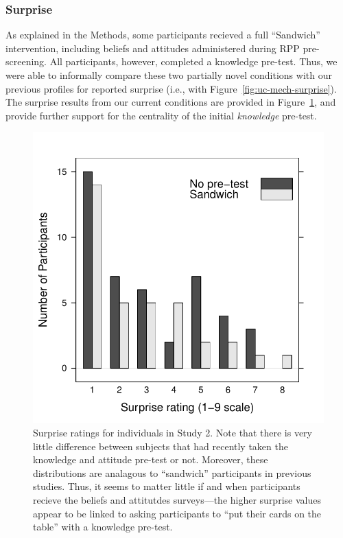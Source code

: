\subsubsection{Surprise}

As explained in the Methods, some participants recieved a full “Sandwich”
intervention, including beliefs and attitudes administered during RPP
pre-screening. All participants, however, completed a knowledge pre-test. Thus,
we were able to informally compare these two partially novel conditions with our
previous profiles for reported surprise (i.e., with
Figure~\ref{fig:uc-mech-surprise}). The surprise results from our current
conditions are provided in Figure~\ref{fig:rpp-mech-surprise}, and provide
further support for the centrality of the initial \emph{knowledge} pre-test.

\begin{figure}
    \centering
    \includegraphics{RPP-mech-surprise-by-group.pdf}
    \caption{Surprise ratings for individuals in Study 2. Note that there is
        very little difference between subjects that had recently taken the
        knowledge and attitude pre-test or not. Moreover, these distributions
        are analagous to “sandwich” participants in previous studies. Thus, it
        seems to matter little if and when participants recieve the beliefs and
        attitutdes surveys---the higher surprise values appear to be linked to
        asking participants to “put their cards on the table” with a knowledge
        pre-test.}
    \label{fig:rpp-mech-surprise}
\end{figure}

